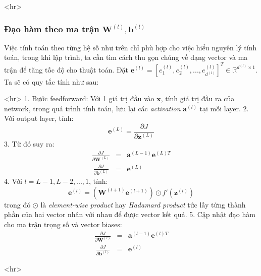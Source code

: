 <hr> 
 
 
 
\subsubsection{Đạo hàm theo ma trận $\mathbf{W}^{(l)}, \mathbf{b}^{(l)}$}
Việc tính toán theo từng hệ số như trên chỉ phù hợp cho việc hiểu nguyên lý tính toán, trong khi lập trình, ta cần tìm cách thu gọn chúng về dạng vector và ma trận để tăng tốc độ cho thuật toán. Đặt $\mathbf{e}^{(l)} = [e_1^{(l)}, e_2^{(l)}, ..., e_{d^{(l)}}^{(l)}]^T \in \mathbb{R}^{d^{(l)}\times 1} $. Ta sẽ có quy tắc tính như sau: 
 
<hr> 
1. Bước feedforward: Với 1 giá trị đầu vào $\mathbf{x}$, tính giá trị đầu ra của network, trong quá trình tính toán, lưu lại các \textit{activation} $\mathbf{a}^{(l)}$ tại mỗi layer. 
2. Với output layer, tính: \begin{equation*}\mathbf{e}^{(L)} = \frac{\partial J}{\partial \mathbf{z}^{(L)}}\end{equation*} 
3. Từ đó suy ra: 
\begin{equation*} 
\begin{eqnarray} 
\frac{\partial J}{\partial \mathbf{W}^{(L)}} &=& \mathbf{a}^{(L-1)}\mathbf{e}^{(L)T}\\\ 
\frac{\partial J}{\partial \mathbf{b}^{(L)}} &=&  \mathbf{e}^{(L)} 
\end{eqnarray} 
\end{equation*} 
4. Với $l = L-1, L-2, ..., 1$, tính: 
\begin{equation*} 
\mathbf{e}^{(l)} = \left( \mathbf{W}^{(l+1)} \mathbf{e}^{(l+1)} \right) \odot f'(\mathbf{z}^{(l)}) 
\end{equation*} 
trong đó $\odot$ là \textit{element-wise product} hay \textit{Hadamard product} tức lấy từng thành phần của hai vector nhân với nhau để được vector kết quả. 
5. Cập nhật đạo hàm cho ma trận trọng số và vector biases: 
\begin{equation*} 
\begin{eqnarray} 
\frac{\partial J}{\partial \mathbf{W}^{(l)}} &=& \mathbf{a}^{(l-1)}\mathbf{e}^{(l)T}\\\ 
\frac{\partial J}{\partial \mathbf{b}^{(l)}} &=& \mathbf{e}^{(l)} 
\end{eqnarray} 
\end{equation*} 
 
<hr> 
 
